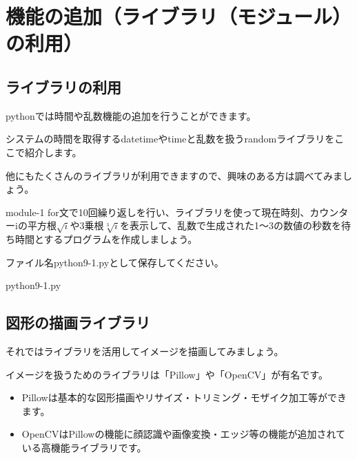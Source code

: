 \documentclass[11pt,a4paper,dvipdfmx,titlepage]{jsreport}
\begin{document}
\section{機能の追加（ライブラリ（モジュール）の利用）}
\subsection{ライブラリの利用}
pythonでは時間や乱数機能の追加を行うことができます。

システムの時間を取得するdatetimeやtimeと乱数を扱うrandomライブラリをここで紹介します。

他にもたくさんのライブラリが利用できますので、興味のある方は調べてみましょう。
\begin{pabox}{module-1}
for文で10回繰り返しを行い、ライブラリを使って現在時刻、カウンターiの平方根$\sqrt{　i　}$や3乗根$\sqrt[3]{　i　}$を表示して、乱数で生成された1～3の数値の秒数を待ち時間とするプログラムを作成しましょう。

ファイル名python9-1.pyとして保存してください。
\begin{codebox}{python9-1.py}
\end{codebox}
\end{pabox}

\subsection{図形の描画ライブラリ}
それではライブラリを活用してイメージを描画してみましょう。

イメージを扱うためのライブラリは「Pillow」や「OpenCV」が有名です。

\begin{itemize}
\item Pillowは基本的な図形描画やリサイズ・トリミング・モザイク加工等ができます。
\item OpenCVはPillowの機能に顔認識や画像変換・エッジ等の機能が追加されている高機能ライブラリです。
\end{itemize}
\end{document}
